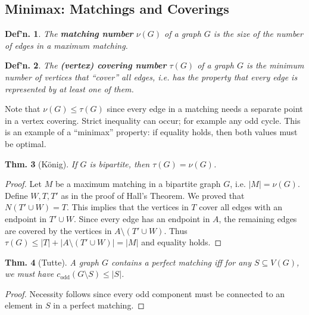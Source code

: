 \documentclass[12pt, a4paper]{book}
\newtheorem{theorem}{Thm.}[section]
\newtheorem{definition}[theorem]{Def'n.}
\theoremstyle{nonumberplain}
\newtheorem{proof}{Proof}
\begin{document}
\subsection{Minimax: Matchings and Coverings}
\begin{definition}
    The \textbf{matching number} $\nu(G)$ of a graph $G$ is the size of the number of edges in a maximum matching.
\end{definition}
\begin{definition}
    The \textbf{(vertex) covering number} $\tau(G)$ of a graph $G$ is the minimum number of vertices that ``cover'' all edges, i.e. has the property that every edge is represented by at least one of them.
\end{definition}
Note that $\nu(G)\leq\tau(G)$ since every edge in a matching needs a separate point in a vertex covering.
Strict inequality can occur; for example any odd cycle.
This is an example of a ``minimax'' property: if equality holds, then both values must be optimal.
\begin{theorem}[K\"onig]
    If $G$ is bipartite, then $\tau(G)=\nu(G)$.
\end{theorem}
\begin{proof}
    Let $M$ be a maximum matching in a bipartite graph $G$, i.e. $|M|=\nu(G)$.
    Define $W,T,T'$ as in the proof of Hall's Theorem.
    We proved that $N(T'\cup W)=T$.
    This implies that the vertices in $T$ cover all edges with an endpoint in $T'\cup W$.
    Since every edge has an endpoint in $A$, the remaining edges are covered by the vertices in $A\setminus(T'\cup W)$.
    Thus $\tau(G)\leq |T|+|A\setminus(T'\cup W)|=|M|$ and equality holds.
\end{proof}
\begin{theorem}[Tutte]
    A graph $G$ contains a perfect matching iff for any $S\subseteq V(G)$, we must have $c_{\text{odd}}(G\setminus S)\leq |S|$.
\end{theorem}
\begin{proof}
    Necessity follows since every odd component must be connected to an element in $S$ in a perfect matching.
\end{proof}
\end{document}
